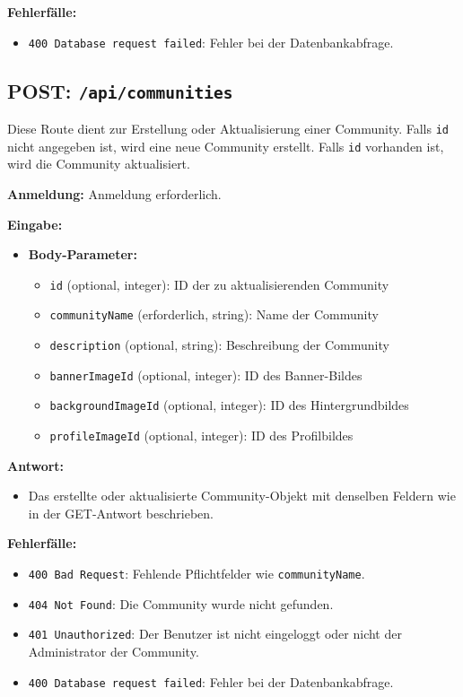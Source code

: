 \documentclass[a4paper,12pt]{article}
\begin{document}
\textbf{Fehlerfälle:}
\begin{itemize}
    \item \texttt{400 Database request failed}: Fehler bei der Datenbankabfrage.
\end{itemize}

\newpage
\subsection{POST: \texttt{/api/communities}}

Diese Route dient zur Erstellung oder Aktualisierung einer Community. Falls
\texttt{id} nicht angegeben ist, wird eine neue Community erstellt. Falls
\texttt{id} vorhanden ist, wird die Community aktualisiert.

\textbf{Anmeldung:} Anmeldung erforderlich.

\textbf{Eingabe:}
\begin{itemize}
    \item \textbf{Body-Parameter:}
    \begin{itemize}
        \item \texttt{id} (optional, integer):
            ID der zu aktualisierenden Community
        \item \texttt{communityName} (erforderlich, string):
            Name der Community
        \item \texttt{description} (optional, string):
            Beschreibung der Community
        \item \texttt{bannerImageId} (optional, integer):
            ID des Banner-Bildes
        \item \texttt{backgroundImageId} (optional, integer):
            ID des Hintergrundbildes
        \item \texttt{profileImageId} (optional, integer):
            ID des Profilbildes
    \end{itemize}
\end{itemize}

\textbf{Antwort:}
\begin{itemize}
    \item Das erstellte oder aktualisierte Community-Objekt mit denselben
    Feldern wie in der GET-Antwort beschrieben.
\end{itemize}

\textbf{Fehlerfälle:}
\begin{itemize}
    \item \texttt{400 Bad Request}:
        Fehlende Pflichtfelder wie \texttt{communityName}.
    \item \texttt{404 Not Found}:
        Die Community wurde nicht gefunden.
    \item \texttt{401 Unauthorized}:
        Der Benutzer ist nicht eingeloggt oder nicht der Administrator der
        Community.
    \item \texttt{400 Database request failed}:
        Fehler bei der Datenbankabfrage.
\end{itemize}
\end{document}
